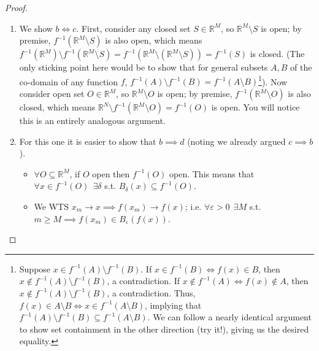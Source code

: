 \documentclass{article}
\theoremstyle{definition}
\begin{document}
\begin{proof}
\begin{enumerate}
      \item We show $b \iff c$. First, consider any closed set $S \in \mathbb{R}^M$, so $\mathbb{R}^M \setminus S$ is open; by premise, $f^{-1}(\mathbb{R}^M \setminus S)$ is also open, which means $f^{-1}(\mathbb{R}^M) \setminus f^{-1}(\mathbb{R}^M \setminus S) = f^{-1}(\mathbb{R}^M \setminus (\mathbb{R}^M \setminus S)) = f^{-1}(S)$ is closed. (The only sticking point here would be to show that for general subsets $A,B$ of the co-domain of any function $f$, $f^{-1}(A)\setminus f^{-1}(B) = f^{-1}(A\setminus B)$\footnote{
          Suppose $x\in f^{-1}(A)\setminus f^{-1}(B)$. If $x\in f^{-1}(B) \Leftrightarrow f(x)\in B$, then $x\not\in f^{-1}(A)\setminus f^{-1}(B)$, a contradiction. If $x \not\in f^{-1}(A) \Leftrightarrow f(x)\not\in A$, then $x\not\in f^{-1}(A)\setminus f^{-1}(B)$, a contradiction. Thus, $f(x)\in A\setminus B \Leftrightarrow x \in f^{-1}(A \setminus B)$, implying that $f^{-1}(A)\setminus f^{-1}(B)\subseteq f^{-1}(A \setminus B)$. We can follow a nearly identical argument to show set containment in the other direction (try it!), giving us the desired equality.
      }). Now consider open set $O \in \mathbb{R}^M$, so $\mathbb{R}^M \setminus O$ is open; by premise, $f^{-1}(\mathbb{R}^M \setminus O)$ is also closed, which means $\mathbb{R}^N \setminus f^{-1}(\mathbb{R}^M \setminus O) = f^{-1}(O)$ is open. You will notice this is an entirely analogous argument.

      \item For this one it is easier to show that $b \implies d$ (noting we already argued $c \implies b$).
      \begin{itemize}
        \item $\forall O \subseteq \mathbb{R}^M$, if $O$ open then $f^{-1}(O)$ open. This means that $\forall x \in f^{-1}(O)~~ \exists\delta$ s.t. $B_{\delta}(x) \subseteq f^{-1}(O)$.

        \item We WTS $x_m \to x \implies f(x_m) \to f(x)$; i.e.  $\forall \varepsilon > 0 ~~ \exists M$ s.t. $m \ge M \implies f(x_m) \in B_{\varepsilon}(f(x))$.

        \begin{figure}[H]
          \centering
\end{figure}
\end{itemize}
\end{enumerate}
\end{proof}
\end{document}
